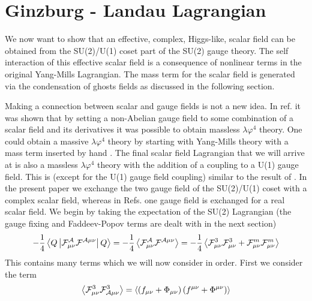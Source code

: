 \documentclass[a4paper,aps,showpacs]{revtex4}
\begin{document}
\section{Ginzburg - Landau Lagrangian}

We now want to show that an effective, complex, Higgs-like, scalar 
field can be obtained from the SU(2)/U(1) coset part of the SU(2) 
gauge theory. The self interaction of this effective scalar field is 
a consequence of nonlinear terms in the original Yang-Mills Lagrangian. 
The mass term for the scalar field is generated via the 
condensation of ghosts fields as discussed in the following section.

Making a connection between scalar and gauge fields is not a new idea. In
ref. \cite{corr} it was shown that by setting a non-Abelian gauge field to 
some combination of a scalar field and its
derivatives it was possible to obtain massless
$\lambda \varphi ^4$ theory. One could
obtain a massive $\lambda \varphi ^4$ theory by starting with
Yang-Mills theory with a mass term inserted by hand \cite{actor}. 
The final scalar field Lagrangian that we will arrive at is also
a massless $\lambda \varphi ^4$ theory with the addition of a 
coupling to a U(1) gauge field. This is (except for the U(1) gauge
field coupling) similar to the result of \cite{corr}. In the present
paper we exchange the two gauge field of the SU(2)/U(1) coset 
with a complex scalar field, whereas in Refs. \cite{corr} \cite{actor}
one gauge field is exchanged for a real scalar field. We begin by taking 
the expectation of the SU(2) Lagrangian (the gauge fixing and Faddeev-Popov 
terms are dealt with in the next section)
\begin{equation}
  -\frac{1}{4}\left\langle Q \left| 
  \cal F^{\cal A}_{\mu \nu} \cal F^{\cal A \mu \nu}  
  \right | Q \right\rangle = 
  -\frac{1}{4} \left\langle 
  \cal F^{\cal A}_{\mu \nu} \cal F^{\cal A \mu \nu} 
  \right\rangle = 
  -\frac{1}{4} \left\langle 
  {\cal F}^3_{\mu \nu} {\cal F}^3_{\mu \nu} + 
  {\cal F}^m_{\mu \nu} {\cal F}^m_{\mu \nu} 
  \right\rangle 
\label{sec3-10}
\end{equation}
This contains many terms which we will now consider in order. 
First we consider the term 
\begin{equation}
  \left\langle 
  {\cal F}^3_{\mu \nu} {\cal F}^3_{\cal A \mu \nu} 
  \right\rangle = 
  \left\langle
    \left(
    f_{\mu \nu} + \Phi_{\mu \nu}
    \right)
    \left(
    f^{\mu \nu} + \Phi^{\mu \nu}
    \right)
  \right\rangle
\label{sec3-20}
\end{equation}
\end{document}
